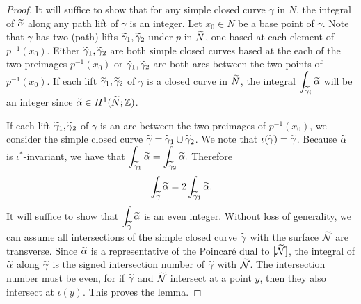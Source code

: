 \begin{proof}
 It will suffice to show that for any simple closed curve $\gamma$ in $N$, the integral of $\widetilde{\alpha}$ along any path lift of $\gamma$ is an integer.  Let $x_0\in N$ be a base point of $\gamma$.  Note that $\gamma$ has two (path) lifts $\widetilde{\gamma}_1,\widetilde{\gamma}_2$ under $p$ in $\widetilde{N}$, one based at each element of $p^{-1}(x_0)$.  Either $\widetilde{\gamma}_1,\widetilde{\gamma}_2$ are both simple closed curves based at the each of the two preimages $p^{-1}(x_0)$ or $\widetilde{\gamma}_1,\widetilde{\gamma}_2$ are both arcs between the two points of $p^{-1}(x_0)$.
  If each lift $\widetilde{\gamma}_1,\widetilde{\gamma}_2$ of $\gamma$ is a closed curve in $\widetilde{N}$, the integral $\displaystyle\int_{\widetilde{\gamma}_i}\widetilde{\alpha}$ will be an integer since $\widetilde{\alpha} \in H^1(\widetilde{N}; \mathbb{Z})$.

 If each lift $\widetilde{\gamma}_1,\widetilde{\gamma}_2$ of $\gamma$ is an arc between the two preimages of $p^{-1}(x_0)$, we consider the simple closed curve $\widetilde{\gamma}=\widetilde{\gamma}_1\cup\widetilde{\gamma}_2$.  We note that $\iota(\widetilde{\gamma})=\widetilde{\gamma}$.
  Because $\widetilde{\alpha}$ is $\iota^{\ast}$-invariant, we have that $ \displaystyle\int_{\widetilde{\gamma}_1} \widetilde{\alpha} = \displaystyle\int_{\widetilde{\gamma}_2} \widetilde{\alpha}.$  Therefore $$\int_{\widetilde{\gamma}}\widetilde{\alpha}=2\int_{\widetilde{\gamma}_1}\widetilde{\alpha}.$$ It will suffice to show that $\displaystyle\int_{\widetilde{\gamma}}\widetilde{\alpha}$ is an even integer.
  Without loss of generality, we can assume all intersections of the simple closed curve $\widetilde{\gamma}$ with the surface $\widetilde{\mathcal{N}}$ are transverse.
  Since $\widetilde{\alpha}$ is a representative of the Poincar\'e dual to $[\widetilde{\mathcal{N}}]$, the integral of $\widetilde{\alpha}$ along $\widetilde{\gamma}$ is the signed intersection number of $\widetilde{\gamma}$ with $\widetilde{\mathcal{N}}$.
  The intersection number must be even, for if $\widetilde{\gamma}$ and $\widetilde{\mathcal{N}}$ intersect at a point $y$, then they also intersect at $\iota(y)$. This proves the lemma.
\end{proof}

